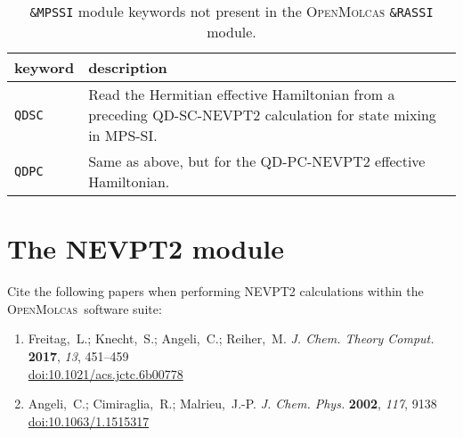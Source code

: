 \documentclass[bibliography=totoc,12pt,a4paper]{scrartcl}
\newcommand{\mol}{\textsc{OpenMolcas}}
\newcommand{\hostp}{\mol}
\newcommand{\tableoptionskip}{0.3em}
\newcommand{\kwd}[1]{\texttt{#1}}
\begin{document}
\begin{table}[h]
  \begin{center}
    \caption{\label{table:mpssi-keyword}\kwd{\&MPSSI} module keywords not present in the \mol{} \kwd{\&RASSI} module.}
    \begin{tabular}{l@{\hspace{0.9cm}}l}
      \toprule
      keyword & description \\
      \midrule
      \multirow{2}{*}{\texttt{QDSC}} &  \multirow{2}{12.2cm}{Read the Hermitian effective Hamiltonian from a preceding QD-SC-NEVPT2 calculation for state mixing in MPS-SI.} \\
      &\\[\tableoptionskip]
      \multirow{2}{*}{\texttt{QDPC}} & \multirow{2}{12.2cm}{Same as above, but for the QD-PC-NEVPT2 effective Hamiltonian.}\\
            &\\
      \bottomrule
    \end{tabular}
  \end{center}
\end{table}
\FloatBarrier

\clearpage
\newpage

\section{The NEVPT2 module}\label{sec:nevpt2}

\begin{framed}
 \noindent Cite the following papers when performing NEVPT2 calculations within the \hostp\ software suite:
\begin{enumerate}
\item Freitag,~L.; Knecht,~S.; Angeli,~C.; Reiher,~M. \emph{J. Chem. Theory Comput.}
  \textbf{2017}, \emph{13}, 451--459\\ \href{https://doi.org/10.1021/acs.jctc.6b00778}{doi:10.1021/acs.jctc.6b00778}
\item Angeli,~C.; Cimiraglia,~R.; Malrieu,~J.-P. \emph{J. Chem. Phys.} \textbf{2002},
  \emph{117}, 9138\\ \href{https://doi.org/10.1063/1.1515317}{doi:10.1063/1.1515317}
\end{enumerate}
\end{framed}
\end{document}
